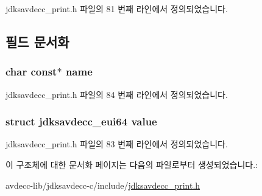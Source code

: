 jdksavdecc\+\_\+print.\+h 파일의 81 번째 라인에서 정의되었습니다.



\subsection{필드 문서화}
\subsubsection[{\texorpdfstring{name}{name}}]{\setlength{\rightskip}{0pt plus 5cm}char const$\ast$ name}\hypertarget{structjdksavdecc__eui64__name_a5f1de76dd5d451949e12c0fbc966ca70}{}\label{structjdksavdecc__eui64__name_a5f1de76dd5d451949e12c0fbc966ca70}


jdksavdecc\+\_\+print.\+h 파일의 84 번째 라인에서 정의되었습니다.

\subsubsection[{\texorpdfstring{value}{value}}]{\setlength{\rightskip}{0pt plus 5cm}struct {\bf jdksavdecc\+\_\+eui64} value}\hypertarget{structjdksavdecc__eui64__name_a4325a443552fab7c52e139a35145c6f9}{}\label{structjdksavdecc__eui64__name_a4325a443552fab7c52e139a35145c6f9}


jdksavdecc\+\_\+print.\+h 파일의 83 번째 라인에서 정의되었습니다.



이 구조체에 대한 문서화 페이지는 다음의 파일로부터 생성되었습니다.\+:\begin{DoxyCompactItemize}
\item 
avdecc-\/lib/jdksavdecc-\/c/include/\hyperlink{jdksavdecc__print_8h}{jdksavdecc\+\_\+print.\+h}\end{DoxyCompactItemize}
